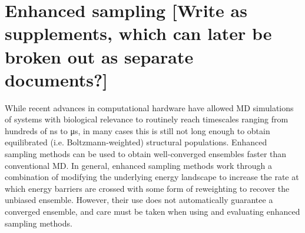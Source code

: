 \section{Enhanced sampling [Write as supplements, which can later be broken out as separate documents?]}

While recent advances in computational hardware have allowed MD simulations of systems with biological relevance to routinely reach timescales ranging from hundreds of \si{\nano\second} to \si{\micro\second}, in many cases this is still not long enough to obtain equilibrated (i.e. Boltzmann-weighted) structural populations. Enhanced sampling methods can be used to obtain well-converged ensembles faster than conventional MD. In general, enhanced sampling methods work through a combination of modifying the underlying energy landscape to increase the rate at which energy barriers are crossed with some form of reweighting to recover the unbiased ensemble. However, their use does not automatically guarantee a converged ensemble, and care must be taken when using and evaluating enhanced sampling methods.

